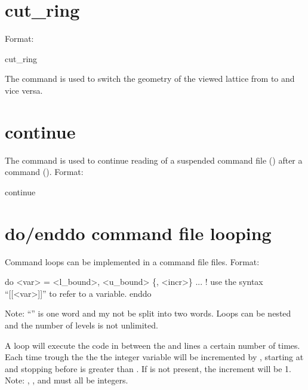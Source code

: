 \section{cut_ring}
\label{s:cut.ring}

Format:
\begin{example}
  cut_ring
\end{example}

The  command is used to switch the geometry of the viewed  lattice from
 to  and vice versa.

\section{continue}
\label{s:continue}

The  command is used to continue reading of a suspended command file
() after a  command (). Format:
\begin{example}
  continue
\end{example}

\section{do/enddo command file looping}
\label{s:do}

Command loops can be implemented in a command file files. Format:
\begin{example}
  do <var> = <l_bound>, <u_bound> \{, <incr>\}
    ...   ! use the syntax ``[[<var>]]'' to refer to a variable.
  enddo
\end{example}
Note: ``'' is one word and my not be split into two words. Loops can be nested and the
number of levels is not unlimited.

A loop will execute the code in between the  and  lines a certain number of
times. Each time trough the the the integer variable  will be incremented by ,
starting at  and stopping before  is greater than . If
 is not present, the increment will be 1. Note: , , and
 must all be integers.

